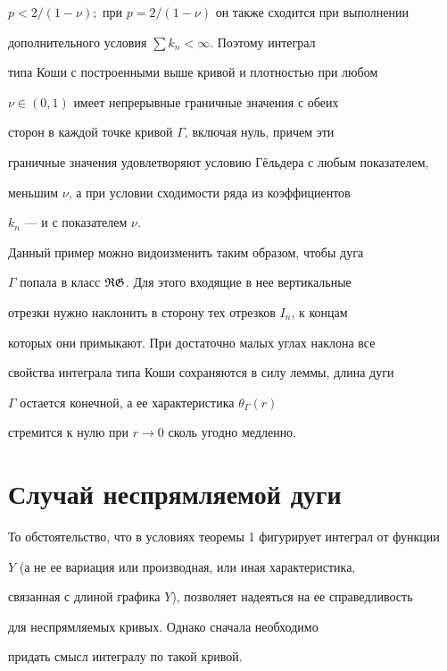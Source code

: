 $p<2/(1-\nu);$ при $p=2/(1-\nu)$ он также сходится при выполнении


дополнительного условия $\sum{k_n}<\infty$. Поэтому интеграл


типа Коши с построенными выше кривой и плотностью при любом


$\nu\in (0,1)$ имеет непрерывные граничные значения с обеих


сторон в каждой точке кривой $\Gamma$, включая нуль, причем эти


граничные значения удовлетворяют условию Г\"ельдера с любым показателем,


меньшим $\nu$, а при условии сходимости ряда из коэффициентов


$k_n$ --- и с показателем $\nu$.





Данный пример можно видоизменить таким образом, чтобы дуга


$\Gamma$ попала в класс $\operatorname{\frak R\frak G}$. Для этого входящие в нее вертикальные


отрезки нужно наклонить в сторону тех отрезков $I_n$, к концам


которых они примыкают. При достаточно малых углах наклона все


свойства интеграла типа Коши сохраняются в силу леммы, длина дуги


$\Gamma$ остается конечной, а ее характеристика $\theta_{\Gamma}(r)$


стремится к нулю при $r\to 0$ сколь угодно медленно.





\section{Случай неспрямляемой дуги}





То обстоятельство, что в условиях теоремы 1 фигурирует интеграл от функции


$Y$ (а не ее вариация или производная, или иная характеристика,


связанная с длиной графика $Y$), позволяет надеяться на ее справедливость


для неспрямляемых кривых. Однако сначала необходимо


придать смысл интегралу по такой кривой.





